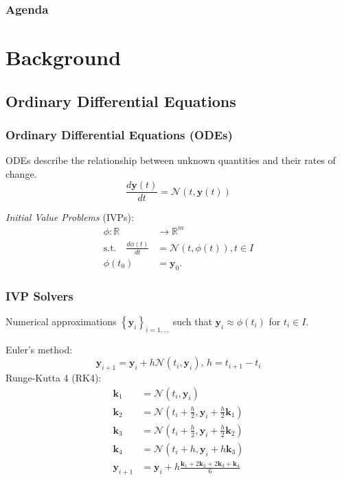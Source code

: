 \documentclass[t]{beamer}
\newcommand{\R}{\mathbb{R}}
\begin{document}
\begin{frame}
\frametitle{Agenda}
\tableofcontents
\end{frame}

\section{Background}

\subsection{Ordinary Differential Equations}

\begin{frame}
    \frametitle{Ordinary Differential Equations (ODEs)}
    ODEs describe the relationship between unknown quantities and their rates of change.
    \begin{equation}
    \frac{d \bm{y}\left( t \right) }{d t} = \mathcal{N}\left( t, \bm{y}\left( t \right)  \right) 
    \end{equation}\pause

    \emph{Initial Value Problems} (IVPs):
    \begin{align*}
	\phi :\R&\to \R^{m} \\
	\text{s.t.} \quad \frac{d \phi\left( t \right) }{d t} &= \mathcal{N}\left( t, \phi\left( t \right)  \right), t\in I \\
		    \phi(t_0) &= \bm{y}_0
    .\end{align*}
\end{frame}

\begin{frame}
    \frametitle{IVP Solvers}
    Numerical approximations $\left\{ \bm{y}_i \right\}_{i=1,\ldots}$ such that $\bm{y}_i \approx \phi(t_i)$ for $t_i \in I$. \pause

    Euler's method: \[
\bm{y}_{i+1} = \bm{y}_{i} + h\mathcal{N}\left( t_i, \bm{y}_i \right),\,h=t_{i+1}-t_i
    \] \pause
    Runge-Kutta 4 (RK4):
    \begin{align*}
	\bm{k}_1 &= \mathcal{N}\left( t_i , \bm{y}_i \right)  \\
	\bm{k}_2 &= \mathcal{N}\left( t_i+\frac{h}{2}, \bm{y}_i + \frac{h}{2}\bm{k}_1 \right)  \\
	\bm{k}_3 &= \mathcal{N}\left( t_i+\frac{h}{2}, \bm{y}_i + \frac{h}{2}\bm{k}_2 \right)  \\
	\bm{k}_4 &= \mathcal{N}\left( t_i+h, \bm{y}_i + h \bm{k}_3 \right) \\
	\bm{y}_{i+1} &= \bm{y}_i + h \frac{\bm{k}_1 + 2\bm{k}_2 + 2 \bm{k}_3 + \bm{k}_4}{6}
    \end{align*}
\end{frame}
\end{document}
